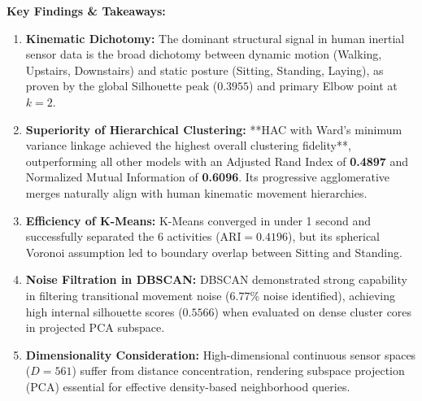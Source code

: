 \documentclass[12pt,a4paper]{article}
\begin{document}
\textbf{Key Findings \& Takeaways:}
\begin{enumerate}[noitemsep]
    \item \textbf{Kinematic Dichotomy:} The dominant structural signal in human inertial sensor data is the broad dichotomy between dynamic motion (Walking, Upstairs, Downstairs) and static posture (Sitting, Standing, Laying), as proven by the global Silhouette peak ($0.3955$) and primary Elbow point at $k=2$.
    \item \textbf{Superiority of Hierarchical Clustering:} **HAC with Ward's minimum variance linkage achieved the highest overall clustering fidelity**, outperforming all other models with an Adjusted Rand Index of \textbf{0.4897} and Normalized Mutual Information of \textbf{0.6096}. Its progressive agglomerative merges naturally align with human kinematic movement hierarchies.
    \item \textbf{Efficiency of K-Means:} K-Means converged in under 1 second and successfully separated the 6 activities ($\text{ARI} = 0.4196$), but its spherical Voronoi assumption led to boundary overlap between Sitting and Standing.
    \item \textbf{Noise Filtration in DBSCAN:} DBSCAN demonstrated strong capability in filtering transitional movement noise ($6.77\%$ noise identified), achieving high internal silhouette scores ($0.5566$) when evaluated on dense cluster cores in projected PCA subspace.
    \item \textbf{Dimensionality Consideration:} High-dimensional continuous sensor spaces ($D=561$) suffer from distance concentration, rendering subspace projection (PCA) essential for effective density-based neighborhood queries.
\end{enumerate}
\end{document}
